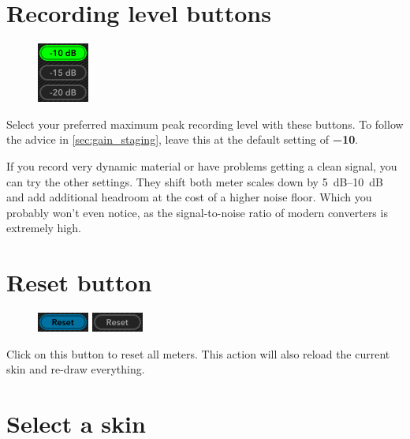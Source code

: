 \section{Recording level buttons}
\label{sec:recording_level_buttons}

\begin{figure}
\includegraphics[scale=\screenshotscale,clip]{include/images/button_recording_level.png}
\end{figure}

Select your preferred maximum peak recording level with these buttons.
To follow the advice in \ref{sec:gain_staging}, leave this at the
default setting of \textbf{\SI{-10}{\dBFS}}.

If you record very dynamic material or have problems getting a clean
signal, you can try the other settings.  They shift both meter scales
down by \SIrange{5}{10}{\dB} and add additional headroom at the cost
of a higher noise floor.  Which you probably won't even notice, as the
signal-to-noise ratio of modern converters is extremely high.

\section{Reset button}
\label{sec:reset_button}

\begin{figure}
\includegraphics[scale=\screenshotscale,clip]{include/images/button_reset_on.png}
\newline \vspace{-0.9\baselineskip}
\includegraphics[scale=\screenshotscale,clip]{include/images/button_reset_off.png}
\end{figure}

Click on this button to reset all meters.  This action will also
reload the current skin and re-draw everything.

\section{Select a skin}

